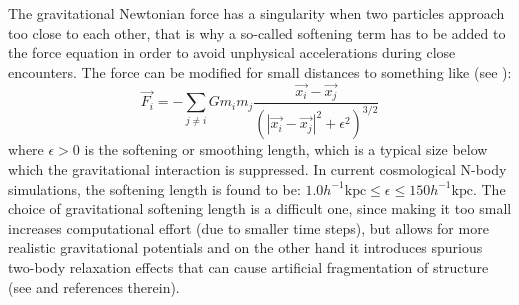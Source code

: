 The gravitational Newtonian force has a singularity when two particles
approach too close to each other, that is why a so-called softening
term has to be added to the force equation in order to avoid unphysical
accelerations during close encounters. The force can be modified for
small distances to something like (see \cite{trenti_gravitational_2008}):
\begin{equation}
\vec{F_{i}}=-\sum_{j\neq i}Gm_{i}m_{j}\frac{\vec{x_{i}}-\vec{x_{j}}}{\left(\left|\vec{x_{i}}-\vec{x_{j}}\right|^{2}+\epsilon^{2}\right)^{3/2}}
\end{equation}
where $\epsilon>0$ is the softening or smoothing length, which is
a typical size below which the gravitational interaction is suppressed.
In current cosmological N-body simulations, the softening length is
found to be: $1.0h^{-1}\mbox{kpc}\leq\epsilon\leq150h^{-1}\mbox{kpc}$.
The choice of gravitational softening length is a difficult one,
since making it too small increases computational effort
(due to smaller time steps), but allows for more realistic gravitational
potentials and on the other hand it introduces spurious two-body relaxation
effects that can cause artificial fragmentation of structure (see
\cite{kuhlen_numerical_2012} and references therein).

